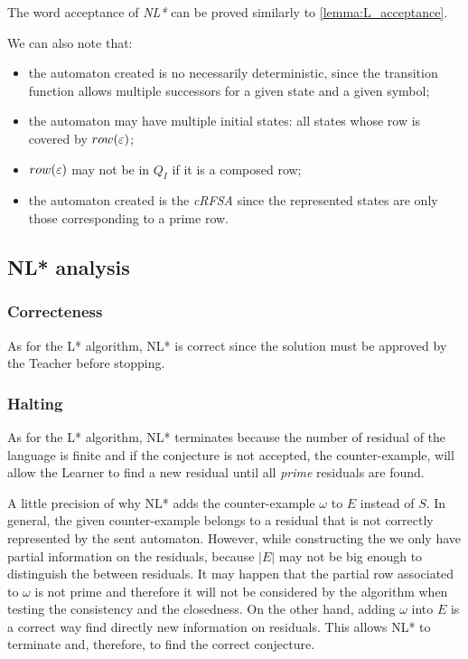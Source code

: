 The word acceptance of \textit{NL*} can be proved similarly to \cref{lemma:L_acceptance}.

We can also note that:
\begin{itemize}
  \item the automaton created is no necessarily deterministic, since the transition function allows multiple successors for a given state and a given symbol;
  \item the automaton may have multiple initial states: all states whose row is covered by $row(\varepsilon)$;
  \item $row(\varepsilon)$ may not be in $Q_I$ if it is a composed row;
  \item the automaton created is the \textit{cRFSA} since the represented states are only those corresponding to a prime row.
\end{itemize}


\subsection{NL* analysis}
\subsubsection{Correcteness}
As for the L* algorithm, NL* is correct since the solution must be approved by the Teacher before stopping.

\subsubsection{Halting}
As for the L* algorithm, NL* terminates because the number of residual of the language is finite and if the conjecture is not accepted, the counter-example, will allow the Learner to find a new residual until all \textit{prime} residuals are found.

A little precision of why NL* adds the counter-example $\omega$ to $E$ instead of $S$. In general, the given counter-example belongs to a residual that is not correctly represented by the sent automaton. However, while constructing the \OT we only have partial information on the residuals, because $|E|$ may not be big enough to distinguish the between residuals. It may happen that the partial row associated to $\omega$ is not prime and therefore it will not be considered by the algorithm when testing the consistency and the closedness. On the other hand, adding $\omega$ into $E$ is a correct way find directly new information on residuals. This allows NL* to terminate and, therefore, to find the correct conjecture.

